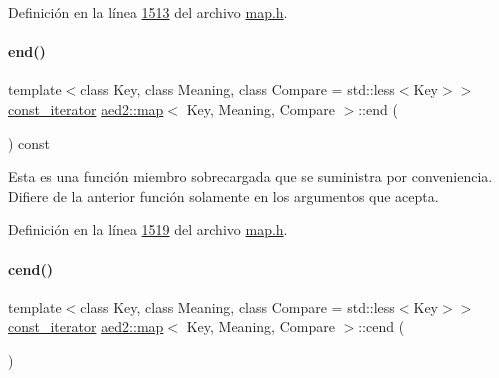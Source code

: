 Definición en la línea \hyperlink{map_8h_source_l01513}{1513} del archivo \hyperlink{map_8h_source}{map.\+h}.

\mbox{\label{classaed2_1_1map_a91e7cad1a638c55659c169d5574cd5d7_a91e7cad1a638c55659c169d5574cd5d7}} 
\paragraph{\texorpdfstring{end()}{end()}\hspace{0.1cm}{\footnotesize\ttfamily [2/2]}}
{\footnotesize\ttfamily template$<$class Key, class Meaning, class Compare = std\+::less$<$\+Key$>$$>$ \\
\hyperlink{classaed2_1_1map_1_1const__iterator}{const\+\_\+iterator} \hyperlink{classaed2_1_1map}{aed2\+::map}$<$ Key, Meaning, Compare $>$\+::end (\begin{DoxyParamCaption}{ }\end{DoxyParamCaption}) const\hspace{0.3cm}{\ttfamily [inline]}}

Esta es una función miembro sobrecargada que se suministra por conveniencia. Difiere de la anterior función solamente en los argumentos que acepta. 

Definición en la línea \hyperlink{map_8h_source_l01519}{1519} del archivo \hyperlink{map_8h_source}{map.\+h}.

\mbox{\label{classaed2_1_1map_a7bb91e94cbc875f1a011b142ef877912_a7bb91e94cbc875f1a011b142ef877912}} 
\paragraph{\texorpdfstring{cend()}{cend()}}
{\footnotesize\ttfamily template$<$class Key, class Meaning, class Compare = std\+::less$<$\+Key$>$$>$ \\
\hyperlink{classaed2_1_1map_1_1const__iterator}{const\+\_\+iterator} \hyperlink{classaed2_1_1map}{aed2\+::map}$<$ Key, Meaning, Compare $>$\+::cend (\begin{DoxyParamCaption}{ }\end{DoxyParamCaption})\hspace{0.3cm}{\ttfamily [inline]}}

